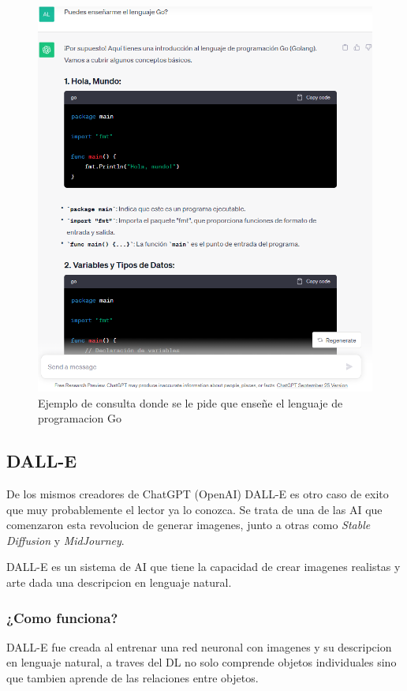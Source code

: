 \documentclass[runningheads]{llncs} %
\begin{document}
\begin{figure}
    \centering
    \includegraphics[scale=0.55]{ej2-chatgpt.png}
    \caption{Ejemplo de consulta donde se le pide que enseñe el 
    lenguaje de programacion Go}
    \label{fig:chatgpt-ej2}
\end{figure}

\subsection{DALL-E}
De los mismos creadores de ChatGPT (OpenAI) DALL-E es otro caso de exito que muy
probablemente el lector ya lo conozca. Se trata  de una de las AI que comenzaron
esta revolucion de generar imagenes, junto a otras como \textit{Stable Diffusion}
y \textit{MidJourney}. \cite{dalle-xtaka}

DALL-E es un sistema de AI que tiene la capacidad de crear imagenes realistas y arte
dada una descripcion en lenguaje natural. \cite{ej-dalle}

\subsubsection{¿Como funciona?}
DALL-E fue creada al entrenar una red neuronal con imagenes y su descripcion en lenguaje
natural, a traves del DL no solo comprende objetos individuales sino que tambien aprende 
de las relaciones entre objetos. \cite{ej-dalle}
\end{document}
